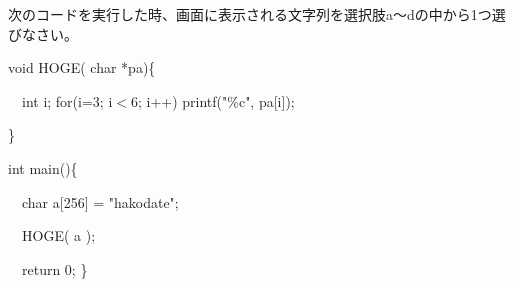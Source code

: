 次のコードを実行した時、画面に表示される文字列を選択肢a〜dの中から1つ選びなさい。\par
\noindent void HOGE( char *pa)\{ \par
\noindent 　int i; for(i=3; i$<$6; i++) printf("\%c", pa[i]); \par
\noindent \} \par
\noindent int main()\{ \par
\noindent 　char a[256] = "hakodate"; \par
\noindent 　HOGE( a ); \par
\noindent 　return 0; \} \par
